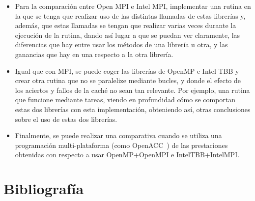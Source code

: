\documentclass[a4paper,12pt]{article}
\begin{document}
\begin{itemize}
    \item Para la comparación entre Open MPI e Intel MPI, implementar una rutina en la que se tenga que realizar uso de las distintas llamadas de estas librerías y, además, que estas llamadas se tengan que realizar varias veces durante la ejecución de la rutina, dando así lugar a que se puedan ver claramente, las diferencias que hay entre usar los métodos de una librería u otra, y las ganancias que hay en una respecto a la otra librería.
    \item Igual que con MPI, se puede coger las librerías de OpenMP e Intel TBB y crear otra rutina que no se paralelize mediante bucles, y donde el efecto de los aciertos y fallos de la caché no sean tan relevante. Por ejemplo, una rutina que funcione mediante tareas, viendo en profundidad cómo se comportan estas dos librerías con esta implementación, obteniendo así, otras conclusiones sobre el uso de estas dos librerías.
    \item Finalmente, se puede realizar una comparativa cuando se utiliza una programación multi-plataforma (como OpenACC~\cite{openACC}) de las prestaciones obtenidas con respecto a usar OpenMP+OpenMPI e IntelTBB+IntelMPI.
\end{itemize}

\newpage

\section{Bibliografía} \label{sec:bibliografia}
\end{document}
